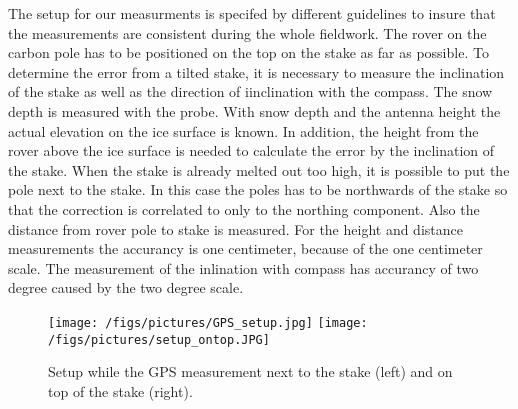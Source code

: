 The setup for our measurments is specifed by different guidelines to insure that the measurements are consistent during the whole fieldwork.
The rover on the carbon pole has to be positioned on the top on the stake as far as possible. 
To determine the error from a tilted stake, it is necessary to measure the inclination of the stake as well as the direction of iinclination with the compass.
The snow depth is measured with the probe.
With snow depth and the antenna height the actual elevation on the ice surface is known. 
In addition, the height from the rover above the ice surface is needed to calculate the error by the inclination of the stake.
When the stake is already melted out too high, it is possible to put the pole next to the stake. 
In this case the poles has to be northwards of the stake so that the correction is correlated to only to the northing component. 
Also the distance from rover pole to stake is measured.
For the height and distance measurements the accurancy is one centimeter, because of the one centimeter scale.
The measurement of the inlination with compass has accurancy of two degree caused by the two degree scale.

\begin{figure}
\centering
\texttt{[image: /figs/pictures/GPS\_setup.jpg]}
\texttt{[image: /figs/pictures/setup\_ontop.JPG]}
\caption{Setup while the GPS measurement next to the stake (left) and on top of the stake (right).}
\end{figure}
